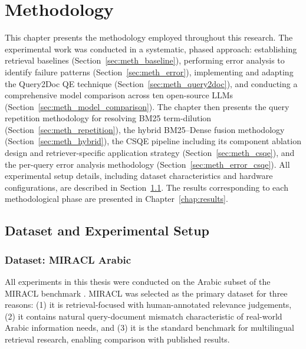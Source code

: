 \chapter{Methodology}
\label{chap:methodology}

This chapter presents the methodology employed throughout this research. The experimental work was conducted in a systematic, phased approach: establishing retrieval baselines (Section~\ref{sec:meth_baseline}), performing error analysis to identify failure patterns (Section~\ref{sec:meth_error}), implementing and adapting the Query2Doc QE technique (Section~\ref{sec:meth_query2doc}), and conducting a comprehensive model comparison across ten open-source LLMs (Section~\ref{sec:meth_model_comparison}). The chapter then presents the query repetition methodology for resolving BM25 term-dilution (Section~\ref{sec:meth_repetition}), the hybrid BM25--Dense fusion methodology (Section~\ref{sec:meth_hybrid}), the CSQE pipeline including its component ablation design and retriever-specific application strategy (Section~\ref{sec:meth_csqe}), and the per-query error analysis methodology (Section~\ref{sec:meth_error_csqe}). All experimental setup details, including dataset characteristics and hardware configurations, are described in Section~\ref{sec:meth_dataset}. The results corresponding to each methodological phase are presented in Chapter~\ref{chap:results}.

\section{Dataset and Experimental Setup}
\label{sec:meth_dataset}

\subsection{Dataset: MIRACL Arabic}
\label{sec:meth_miracl}

All experiments in this thesis were conducted on the Arabic subset of the MIRACL benchmark \cite{zhang_2023_miracl}. MIRACL was selected as the primary dataset for three reasons: (1) it is retrieval-focused with human-annotated relevance judgements, (2) it contains natural query-document mismatch characteristic of real-world Arabic information needs, and (3) it is the standard benchmark for multilingual retrieval research, enabling comparison with published results.

